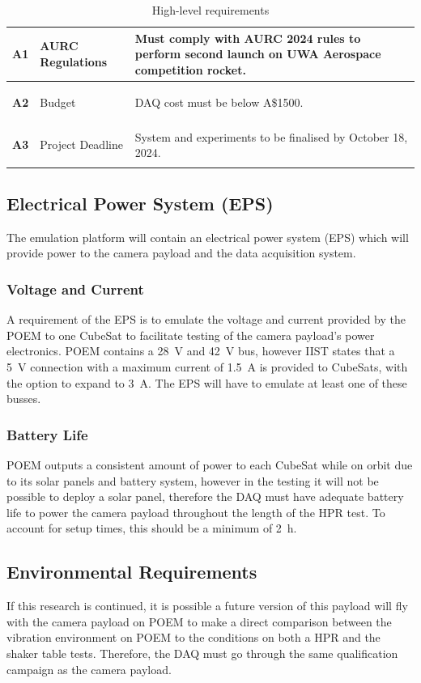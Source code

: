 \documentclass{report}
\newcommand{\aud}{A\$}
\begin{document}
\begin{table}[h!]
\begin{tabular}{|l|L{0.25\textwidth}|L{0.6\textwidth}|}
    \hypertarget{req-A1}{\textbf{A1}} & AURC Regulations               & Must comply with AURC 2024 rules to perform second launch on UWA Aerospace competition rocket.      \\ \hline
    \hypertarget{req-A2}{\textbf{A2}} & Budget                         & DAQ cost must be below \aud 1500.                                                                   \\ \hline
    \hypertarget{req-A3}{\textbf{A3}} & Project Deadline               & System and experiments to be finalised by October 18, 2024.                                         \\ \hline
  \end{tabular}
  \caption{High-level requirements}
  \label{tabl:high-level-requirements}
\end{table}


\subsection{Electrical Power System (EPS)}
The emulation platform will contain an electrical power system (EPS) which will provide power to the camera payload and the data acquisition system.

\subsubsection{Voltage and Current}
A requirement of the EPS is to emulate the voltage and current provided by the POEM to one CubeSat to facilitate testing of the camera payload's power electronics. POEM contains a \SI{28}{\volt} and \SI{42}{\volt} bus, however IIST states that a \SI{5}{\volt} connection with a maximum current of \SI{1.5}{\ampere} is provided to CubeSats, with the option to expand to \SI{3}{\ampere}. The EPS will have to emulate at least one of these busses.

\subsubsection{Battery Life}
POEM outputs a consistent amount of power to each CubeSat while on orbit due to its solar panels and battery system, however in the testing it will not be possible to deploy a solar panel, therefore the DAQ must have adequate battery life to power the camera payload throughout the length of the HPR test. To account for setup times, this should be a minimum of \SI{2}{\hour}.

\subsection{Environmental Requirements}
\label{sec:environmental-requirements}
If this research is continued, it is possible a future version of this payload will fly with the camera payload on POEM to make a direct comparison between the vibration environment on POEM to the conditions on both a HPR and the shaker table tests. Therefore, the DAQ must go through the same qualification campaign as the camera payload.
\end{document}
